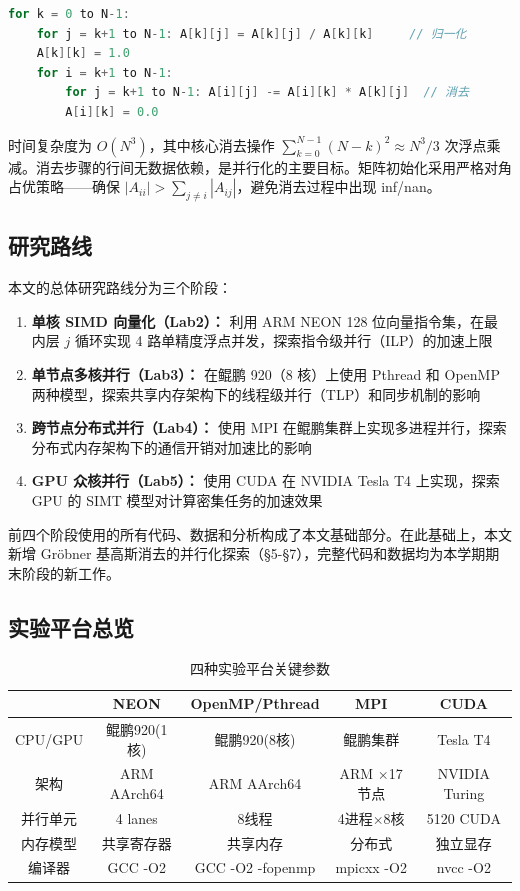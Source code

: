 \documentclass[a4paper]{article}
\begin{document}
\begin{lstlisting}[title=普通高斯消去串行算法,frame=trbl,language={C++}]
for k = 0 to N-1:
    for j = k+1 to N-1: A[k][j] = A[k][j] / A[k][k]     // 归一化
    A[k][k] = 1.0
    for i = k+1 to N-1:
        for j = k+1 to N-1: A[i][j] -= A[i][k] * A[k][j]  // 消去
        A[i][k] = 0.0
\end{lstlisting}

时间复杂度为 $O(N^3)$，其中核心消去操作 $\sum_{k=0}^{N-1}(N-k)^2 \approx N^3/3$ 次浮点乘减。消去步骤的行间无数据依赖，是并行化的主要目标。矩阵初始化采用严格对角占优策略——确保 $|A_{ii}| > \sum_{j \neq i}|A_{ij}|$，避免消去过程中出现 inf/nan。

\subsection{研究路线}

本文的总体研究路线分为三个阶段：

\begin{enumerate}
    \item \textbf{单核 SIMD 向量化（Lab2）：} 利用 ARM NEON 128 位向量指令集，在最内层 $j$ 循环实现 4 路单精度浮点并发，探索指令级并行（ILP）的加速上限
    \item \textbf{单节点多核并行（Lab3）：} 在鲲鹏 920（8 核）上使用 Pthread 和 OpenMP 两种模型，探索共享内存架构下的线程级并行（TLP）和同步机制的影响
    \item \textbf{跨节点分布式并行（Lab4）：} 使用 MPI 在鲲鹏集群上实现多进程并行，探索分布式内存架构下的通信开销对加速比的影响
    \item \textbf{GPU 众核并行（Lab5）：} 使用 CUDA 在 NVIDIA Tesla T4 上实现，探索 GPU 的 SIMT 模型对计算密集任务的加速效果
\end{enumerate}

前四个阶段使用的所有代码、数据和分析构成了本文基础部分。在此基础上，本文新增 Gröbner 基高斯消去的并行化探索（§5-§7），完整代码和数据均为本学期期末阶段的新工作。

\subsection{实验平台总览}

\begin{table}[H]
  \centering
  \caption{四种实验平台关键参数}
  \begin{tabular}{|c|c|c|c|c|}
  \hline
  & \textbf{NEON} & \textbf{OpenMP/Pthread} & \textbf{MPI} & \textbf{CUDA} \\
  \hline
  CPU/GPU & 鲲鹏920(1核) & 鲲鹏920(8核) & 鲲鹏集群 & Tesla T4 \\
  架构 & ARM AArch64 & ARM AArch64 & ARM $\times$17节点 & NVIDIA Turing \\
  并行单元 & 4 lanes & 8线程 & 4进程$\times$8核 & 5120 CUDA \\
  内存模型 & 共享寄存器 & 共享内存 & 分布式 & 独立显存 \\
  编译器 & GCC -O2 & GCC -O2 -fopenmp & mpicxx -O2 & nvcc -O2 \\
  \hline
  \end{tabular}
\end{table}
\end{document}
